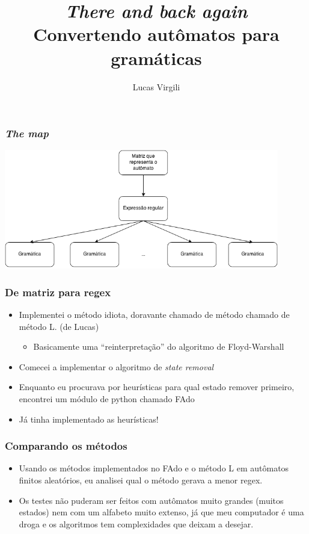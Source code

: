 \documentclass{beamer}
\title{\emph{There and back again}\\Convertendo aut\^omatos para gram\'aticas}
\author{Lucas Virgili}
\date{}
\begin{document}
\begin{frame}[fragile]
  \titlepage
\end{frame}

\begin{frame}[fragile]
  \frametitle{\emph{The map}}
  \begin{center}
  \includegraphics[width=0.9\textwidth]{estruturabranco.png}
  \end{center}
\end{frame}

\begin{frame}[fragile]
  \frametitle{De matriz para regex}
  \begin{itemize}
  \item Implementei o m\'etodo idiota, doravante chamado de m\'etodo
    chamado de m\'etodo L. (de Lucas)
    \begin{itemize}
    \item Basicamente uma ``reinterpreta\c c\~ao'' do algoritmo de
      Floyd-Warshall
    \end{itemize}
  \item Comecei a implementar o algoritmo de \emph{state removal}
  \item Enquanto eu procurava por heur\'isticas para qual estado
    remover primeiro, encontrei um m\'odulo de python chamado FAdo
  \item J\'a tinha implementado as heur\'isticas!
  \end{itemize}
\end{frame}

\begin{frame}[fragile]
  \frametitle{Comparando os m\'etodos}
  \begin{itemize}
  \item Usando os m\'etodos implementados no FAdo e o m\'etodo L em
    aut\^omatos finitos aleat\'orios, eu analisei qual o m\'etodo
    gerava a menor regex.
  \item Os testes n\~ao puderam ser feitos com aut\^omatos muito
    grandes (muitos estados) nem com um alfabeto muito extenso, j\'a
    que meu computador \'e uma droga e os algoritmos tem complexidades
    que deixam a desejar.
  \end{itemize}
\end{frame}
\end{document}
